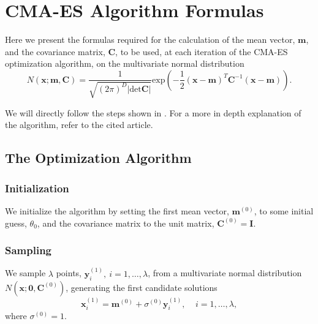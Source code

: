 
\chapter{CMA-ES Algorithm Formulas}
\label{chapter:CMAESAlg}

Here we present the formulas required for the calculation of the mean vector, $\mathbf{m}$, and the covariance matrix, $\mathbf{C}$, to be used, at each iteration of the CMA-ES optimization algorithm, on the multivariate normal distribution
\begin{equation}
N(\mathbf{x;m,C})=\frac{1}{\sqrt{(2\pi)^D|\mathrm{det}\mathbf{C}|}}\mathrm{exp}\left(-\frac{1}{2}(\mathbf{x}-\mathbf{m})^T\mathbf{C}^{-1}(\mathbf{x}-\mathbf{m})\right).
\end{equation}

We will directly follow the steps shown in \citep{DilaoCMA}. For a more in depth explanation of the algorithm, refer to the cited article.

\section{The Optimization Algorithm}
\subsection{Initialization}
We initialize the algorithm by setting the first mean vector, $\mathbf{m}^{(0)}$, to some initial guess, $\theta_0$, and the covariance matrix to the unit matrix, $\mathbf{C}^{(0)}=\mathbf{I}$.

\subsection{Sampling}
We sample $\lambda$ points, $\mathbf{y}_i^{(1)},\ i=1,\ldots,\lambda$, from a multivariate normal distribution $N(\mathbf{x};\mathbf{0},\mathbf{C}^{(0)})$, generating the first candidate solutions
\begin{equation}
\mathbf{x}^{(1)}_i=\mathbf{m}^{(0)}+\sigma^{(0)}\mathbf{y}^{(1)}_i, \ \ \ \ \ i=1,\ldots,\lambda,
\end{equation} 
\noindent where $\sigma^{(0)}=1$.


